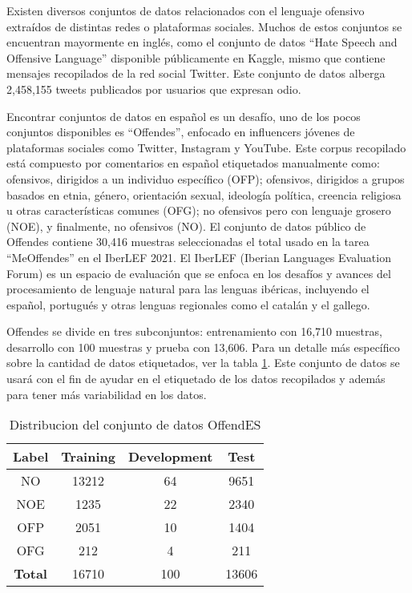 Existen diversos conjuntos de datos relacionados con el lenguaje ofensivo extraídos de distintas redes o plataformas sociales. Muchos de estos conjuntos se encuentran mayormente en inglés, como el conjunto de datos ``Hate Speech and Offensive Language'' disponible públicamente en Kaggle, mismo que contiene mensajes recopilados de la red social Twitter. Este conjunto de datos alberga 2,458,155 tweets publicados por usuarios que expresan odio.

Encontrar conjuntos de datos en español es un desafío, uno de los pocos conjuntos disponibles es ``Offendes'', enfocado en influencers jóvenes de plataformas sociales como Twitter, Instagram y YouTube. Este corpus recopilado está compuesto por comentarios en español etiquetados manualmente como: ofensivos, dirigidos a un individuo específico (OFP); ofensivos, dirigidos a grupos basados en etnia, género, orientación sexual, ideología política, creencia religiosa u otras características comunes (OFG); no ofensivos pero con lenguaje grosero (NOE), y finalmente, no ofensivos (NO). El conjunto de datos público de Offendes contiene 30,416 muestras seleccionadas el total usado en la tarea ``MeOffendes'' en el IberLEF 2021. El IberLEF (Iberian Languages Evaluation Forum) es un espacio de evaluación que se enfoca en los desafíos y avances del procesamiento de lenguaje natural para las lenguas ibéricas, incluyendo el español, portugués y otras lenguas regionales como el catalán y el gallego.

Offendes se divide en tres subconjuntos: entrenamiento con 16,710 muestras, desarrollo con 100 muestras y prueba con 13,606. Para un detalle más específico sobre la cantidad de datos etiquetados, ver la tabla \ref{tbl:13}. Este conjunto de datos se usará con el fin de ayudar en el etiquetado de los datos recopilados y además para tener más variabilidad en los datos.

\begin{table}[!ht]
	\centering
	\begin{tabular}{|c|c|c|c|}
		\hline
		\textbf{Label} & \textbf{Training} & \textbf{Development} & \textbf{Test} \\ \hline
		NO & 13212 & 64 & 9651 \\ 
		NOE & 1235 & 22 & 2340 \\ 
		OFP & 2051 & 10 & 1404 \\ 
		OFG & 212 & 4 & 211 \\ \hline
		\textbf{Total} & 16710 & 100 & 13606 \\ \hline
	\end{tabular}
	\caption{Distribucion del conjunto de datos OffendES}
	\label{tbl:13}
\end{table}

